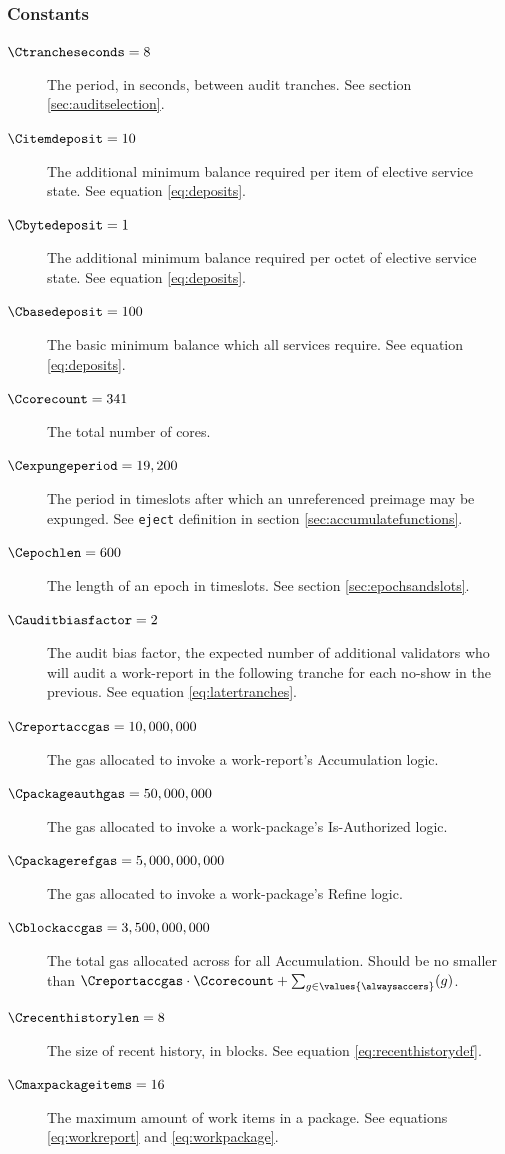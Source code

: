 \subsubsection{Constants}

\begin{description}
  \item[$\Ctrancheseconds = 8$] The period, in seconds, between audit tranches. See section \ref{sec:auditselection}.
  \item[$\Citemdeposit = 10$] The additional minimum balance required per item of elective service state. See equation \ref{eq:deposits}.
  \item[$\Cbytedeposit = 1$] The additional minimum balance required per octet of elective service state. See equation \ref{eq:deposits}.
  \item[$\Cbasedeposit = 100$] The basic minimum balance which all services require. See equation \ref{eq:deposits}.
  \item[$\Ccorecount = 341$] The total number of cores.
  \item[$\Cexpungeperiod = 19,200$] The period in timeslots after which an unreferenced preimage may be expunged. See \texttt{eject} definition in section \ref{sec:accumulatefunctions}.
  \item[$\Cepochlen = 600$] The length of an epoch in timeslots. See section \ref{sec:epochsandslots}.
  \item[$\Cauditbiasfactor = 2$] The audit bias factor, the expected number of additional validators who will audit a work-report in the following tranche for each no-show in the previous. See equation \ref{eq:latertranches}.
  \item[$\Creportaccgas = 10,000,000$] The gas allocated to invoke a work-report's Accumulation logic.
  \item[$\Cpackageauthgas = 50,000,000$] The gas allocated to invoke a work-package's Is-Authorized logic.
  \item[$\Cpackagerefgas = 5,000,000,000$] The gas allocated to invoke a work-package's Refine logic.
  \item[$\Cblockaccgas = 3,500,000,000$] The total gas allocated across for all Accumulation. Should be no smaller than $\Creportaccgas\cdot\Ccorecount + \sum_{g \in \values{\alwaysaccers}}(g)$.
  \item[$\Crecenthistorylen = 8$] The size of recent history, in blocks. See equation \ref{eq:recenthistorydef}.
  \item[$\Cmaxpackageitems = 16$] The maximum amount of work items in a package. See equations \ref{eq:workreport} and \ref{eq:workpackage}.

\end{description}
